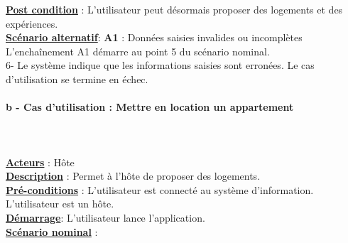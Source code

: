 \begin{flushleft}
 \underline{\textbf{Post condition}} : L’utilisateur peut désormais proposer des logements et des expériences.
\\\underline{\textbf{Scénario alternatif}}:
\textbf{A1} : Données saisies invalides ou incomplètes
\\L'enchaînement A1 démarre au point 5 du scénario nominal.
\\6- Le système indique que les informations saisies sont erronées. Le cas d’utilisation se termine en échec.
\end{flushleft}

\newpage
\paragraph{b - Cas d'utilisation : Mettre en location un appartement} 
$ $\\$ $\\\underline{\textbf{Acteurs}} : Hôte
\\\underline{\textbf{Description}} : Permet à l'hôte de proposer des logements.
\\\underline{\textbf{Pré-conditions}} : L'utilisateur est connecté au système d’information. L'utilisateur est un hôte.
\\\underline{\textbf{Démarrage}}: L’utilisateur lance l’application.
\\\underline{\textbf{Scénario nominal}} :

